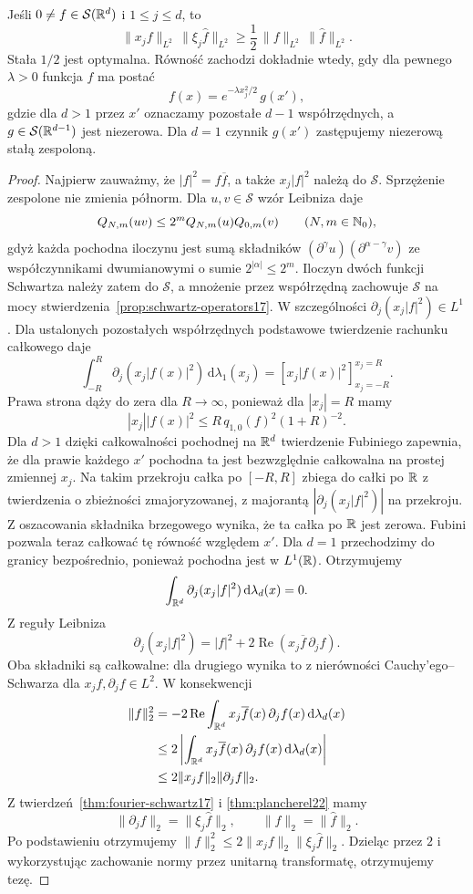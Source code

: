 \begin{twierdzenie}
\label{thm:dt-uncertainty}
Jeśli $0\ne f\in\mathcal S(\mathbb R^d)$ i $1\le j\le d$, to
\[
 \|x_jf\|_{L^2}\,\|\xi_j\widehat f\|_{L^2}
 \ge\frac12\,\|f\|_{L^2}\,\|\widehat f\|_{L^2}.
\]
Stała $1/2$ jest optymalna. Równość zachodzi
dokładnie wtedy, gdy dla pewnego $\lambda>0$
funkcja $f$ ma postać
\[
 f(x)=e^{-\lambda x_j^2/2}\,g(x'),
\]
gdzie dla $d>1$ przez $x'$ oznaczamy pozostałe
$d-1$ współrzędnych, a $g\in\mathcal S(\mathbb R^{d-1})$
jest niezerowa. Dla $d=1$ czynnik $g(x')$
zastępujemy niezerową stałą zespoloną.
\end{twierdzenie}
\begin{proof}
Najpierw zauważmy, że $|f|^2=f\overline f$,
a także $x_j|f|^2$ należą do $\mathcal S$.
Sprzężenie zespolone nie zmienia półnorm.
Dla $u,v\in\mathcal S$ wzór Leibniza daje
\[
 Q_{N,m}(uv)\le 2^m Q_{N,m}(u)Q_{0,m}(v)
 \qquad(N,m\in\mathbb N_0),
\]
gdyż każda pochodna iloczynu jest sumą składników
$(\partial^\gamma u)(\partial^{\alpha-\gamma}v)$
ze współczynnikami dwumianowymi o sumie $2^{|\alpha|}\le2^m$.
Iloczyn dwóch funkcji Schwartza należy zatem do
$\mathcal S$, a mnożenie przez współrzędną zachowuje
$\mathcal S$ na mocy stwierdzenia~\ref{prop:schwartz-operators17}.
W szczególności $\partial_j(x_j|f|^2)\in L^1$.
Dla ustalonych pozostałych współrzędnych
podstawowe twierdzenie rachunku całkowego daje
\[
 \int_{-R}^R\partial_j(x_j|f(x)|^2)
 \,\mathrm d\lambda_1(x_j)
 =\left[x_j|f(x)|^2\right]_{x_j=-R}^{x_j=R}.
\]
Prawa strona dąży do zera dla $R\to\infty$,
ponieważ dla $|x_j|=R$ mamy
\[
 |x_j||f(x)|^2
 \le R\,q_{1,0}(f)^2(1+R)^{-2}.
\]
Dla $d>1$ dzięki całkowalności pochodnej
na $\mathbb R^d$ twierdzenie Fubiniego zapewnia, że
dla prawie każdego $x'$ pochodna ta jest
bezwzględnie całkowalna na prostej zmiennej $x_j$.
Na takim przekroju całka po $[-R,R]$ zbiega
do całki po $\mathbb R$ z twierdzenia o zbieżności
zmajoryzowanej, z majorantą
$|\partial_j(x_j|f|^2)|$ na przekroju.
Z oszacowania składnika brzegowego wynika,
że ta całka po $\mathbb R$ jest zerowa. Fubini
pozwala teraz całkować tę równość względem $x'$.
Dla $d=1$ przechodzimy do granicy bezpośrednio,
ponieważ pochodna jest w $L^1(\mathbb R)$.
Otrzymujemy
\[
 \int_{\mathbb R^d}\partial_j(x_j|f|^2)
 \,\mathrm d\lambda_d(x)=0.
\]
Z reguły Leibniza
\[
 \partial_j(x_j|f|^2)
 =|f|^2+2\operatorname{Re}(x_j\overline f\,\partial_j f).
\]
Oba składniki są całkowalne: dla drugiego
wynika to z nierówności Cauchy'ego--Schwarza
dla $x_jf,\partial_j f\in L^2$.
W konsekwencji
\[
 \begin{aligned}
 \|f\|_2^2
 &=-2\operatorname{Re}
 \int_{\mathbb R^d}x_j\overline f(x)\,\partial_j f(x)
 \,\mathrm d\lambda_d(x)\\
 &\le 2\left|
 \int_{\mathbb R^d}x_j\overline f(x)\,\partial_j f(x)
 \,\mathrm d\lambda_d(x)\right|\\
 &\le 2\|x_j f\|_2\|\partial_j f\|_2.
 \end{aligned}
\]
Z twierdzeń~\ref{thm:fourier-schwartz17}
i \ref{thm:plancherel22} mamy
\[
 \|\partial_j f\|_2=\|\xi_j\widehat f\|_2,
 \qquad
 \|f\|_2=\|\widehat f\|_2.
\]
Po podstawieniu otrzymujemy
$\|f\|_2^2\le2\|x_jf\|_2\|\xi_j\widehat f\|_2$.
Dzieląc przez $2$ i wykorzystując zachowanie normy
przez unitarną transformatę, otrzymujemy tezę.


\end{proof}
